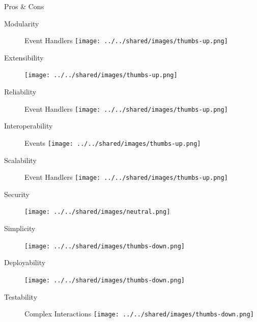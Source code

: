 \documentclass{slide}
\begin{document}
\begin{frame}{Pros \& Cons}
    \vspace{1mm}
    {\LARGE
    \begin{description}
        \item[Modularity] Event Handlers \tabto{15em}\texttt{[image: ../../shared/images/thumbs-up.png]}
        \item[Extensibility] \tabto{15em}\texttt{[image: ../../shared/images/thumbs-up.png]}
        \item[Reliability] Event Handlers \tabto{15em}\texttt{[image: ../../shared/images/thumbs-up.png]}
        \item[Interoperability] Events \tabto{15em}\texttt{[image: ../../shared/images/thumbs-up.png]}
        \item[Scalability] Event Handlers \tabto{15em}\texttt{[image: ../../shared/images/thumbs-up.png]}
        \item[Security] \tabto{15em}\texttt{[image: ../../shared/images/neutral.png]}
        \item[Simplicity] \tabto{15em}\texttt{[image: ../../shared/images/thumbs-down.png]}
        \item[Deployability] \tabto{15em}\texttt{[image: ../../shared/images/thumbs-down.png]}
        \item[Testability] Complex Interactions \tabto{15em}\texttt{[image: ../../shared/images/thumbs-down.png]}
    \end{description}
    }
\end{frame}
\end{document}
